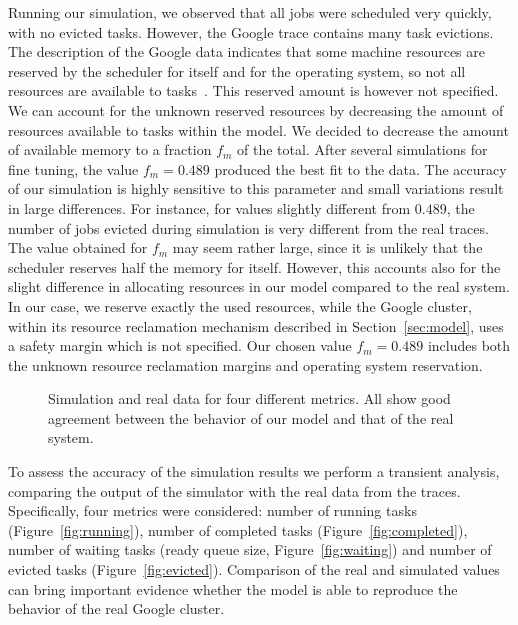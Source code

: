 \documentclass{article}
\begin{document}
Running our simulation, we observed that all jobs were scheduled very quickly, with no evicted tasks. However, the Google trace contains many task evictions. The description of the Google data indicates that some machine resources are reserved by the scheduler for itself and for the operating system, so not all resources are available to tasks~\cite{reissgoogle}. This reserved amount is however not specified. We can account for the unknown reserved resources by decreasing the amount of resources available to tasks within the model. We decided to decrease the amount of available memory to a fraction $f_m$ of the total. After several simulations for fine tuning, the value $f_m=0.489$ produced the best fit to the data. The accuracy of our simulation is highly sensitive to this parameter and small variations result in large differences.  For instance, for values slightly different from $0.489$, the number of jobs evicted during simulation is very different from the real traces.  The value obtained for $f_m$ may seem rather large, since it is unlikely that the scheduler reserves half the memory for itself. However, this accounts also for the slight difference in allocating resources in our model compared to the real system. In our case, we reserve exactly the used resources, while the Google cluster, within its resource reclamation mechanism described in Section~\ref{sec:model}, uses a safety margin which is not specified. Our chosen value $f_m=0.489$ includes both the unknown resource reclamation margins and operating system reservation. 
\begin{figure}
\centering
{}
 \qquad
    \qquad
    \qquad
\caption{Simulation and real data for four different metrics. All show good agreement between the behavior of our model and that of the real system.}      
\end{figure}

To assess the accuracy of the simulation results we perform a transient analysis, comparing the output of the simulator with the real data from the traces. Specifically, four metrics were considered: number of running tasks (Figure~\ref{fig:running}), number of completed tasks (Figure~\ref{fig:completed}), number of waiting tasks (ready queue size, Figure~\ref{fig:waiting}) and number of evicted tasks (Figure~\ref{fig:evicted}). Comparison of the real and simulated values can bring important evidence whether the model is able to reproduce the behavior of the real Google cluster. 
\end{document}
